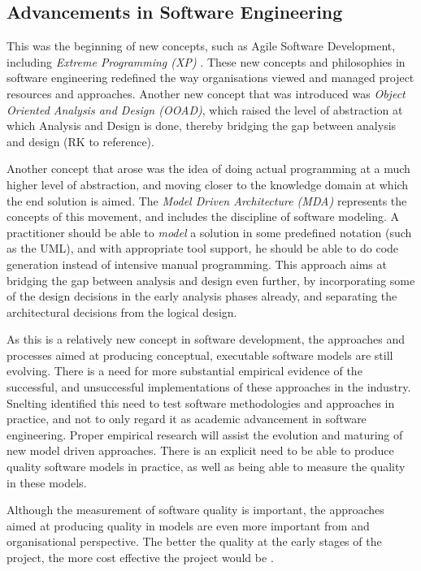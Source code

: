 
\subsection{Advancements in Software Engineering}
This was the beginning of new concepts, such as Agile Software Development, including {\it Extreme Programming (XP)} \cite{abrahamsson_2003:newDirectionsInAgileMethods}. These new concepts and philosophies in software engineering redefined the way organisations viewed and managed project resources and approaches. Another new concept that was introduced was {\it Object Oriented Analysis and Design (OOAD)}, which raised the level of abstraction at which Analysis and Design is done, thereby bridging the gap between analysis and design (RK to reference).

Another concept that arose was the idea of doing actual programming at a much higher level of abstraction, and moving closer to the knowledge domain at which the end solution is aimed. The {\it Model Driven Architecture (MDA)} \cite{frankel_2003:enterpriseMDA,siegel_2001:developingInMDA} represents the concepts of this movement, and includes the discipline of software modeling. A practitioner should be able to {\it model} a solution in some predefined notation (such as the UML), and with appropriate tool support, he should be able to do code generation instead of intensive manual programming. This approach aims at bridging the gap between analysis and design even further, by incorporating some of the design decisions in the early analysis phases already, and separating the architectural decisions from the logical design.

As this is a relatively new concept in software development, the approaches and processes aimed at producing conceptual, executable software models are still evolving. There is a need for more substantial empirical evidence of the successful, and unsuccessful implementations of these approaches in the industry. Snelting \cite{snelting_1998:pauFeyerabendUndDieSoftwareTechnologie} identified this need to test software methodologies and approaches in practice, and not to only regard it as academic advancement in software engineering. Proper empirical research will assist the evolution and maturing of new model driven approaches. There is an explicit need to be able to produce quality software models in practice, as well as being able to measure the quality in these models.

Although the measurement of software quality is important, the approaches aimed at producing quality in models are even more important from and organisational perspective. The better the quality at the early stages of the project, the more cost effective the project would be \cite{coram_2005:impactOfAgileMethodsOnProjectManagement}.

